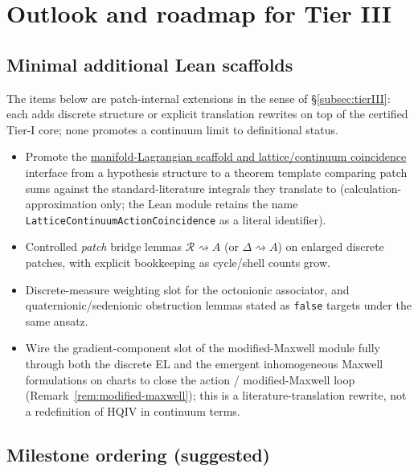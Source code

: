 \documentclass[11pt]{amsart}
\begin{document}
\section{Outlook and roadmap for Tier III}
\label{sec:outlook}

\subsection{Minimal additional Lean scaffolds}

The items below are patch-internal extensions in the sense of \S\ref{subsec:tierIII}: each adds discrete structure or explicit translation rewrites on top of the certified Tier-I core; none promotes a continuum limit to definitional status.

\begin{itemize}
\item Promote the \hyperref[lean:scaffold-bridge]{manifold-Lagrangian scaffold and lattice/continuum coincidence} interface from a hypothesis structure to a theorem template comparing patch sums against the standard-literature integrals they translate to (calculation-approximation only; the Lean module retains the name \texttt{LatticeContinuumActionCoincidence} as a literal identifier).
\item Controlled \emph{patch} bridge lemmas \(\mathcal{R}\rightsquigarrow A\) (or \(\Delta\rightsquigarrow A\)) on enlarged discrete patches, with explicit bookkeeping as cycle/shell counts grow.
\item Discrete-measure weighting slot for the octonionic associator, and quaternionic/sedenionic obstruction lemmas stated as \texttt{false} targets under the same ansatz.
\item Wire the gradient-component slot of the modified-Maxwell module fully through both the discrete EL and the emergent inhomogeneous Maxwell formulations on charts to close the action / modified-Maxwell loop (Remark~\ref{rem:modified-maxwell}); this is a literature-translation rewrite, not a redefinition of HQIV in continuum terms.
\end{itemize}

\subsection{Milestone ordering (suggested)}
\end{document}
